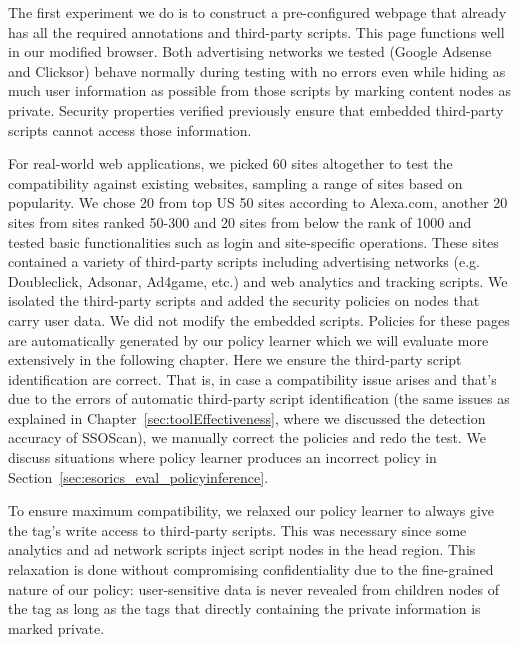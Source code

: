 The first experiment we do is to construct a pre-configured webpage that already has all the required annotations and third-party scripts.  This page functions well in our modified browser.  Both advertising networks we tested (Google Adsense and Clicksor) behave normally during testing with no errors even while hiding as much user information as possible from those scripts by marking content nodes as private.  Security properties verified previously ensure that embedded third-party scripts cannot access those information.  

For real-world web applications, we picked 60 sites altogether to test the compatibility against existing websites, sampling a range of sites based on popularity.  We chose 20 from top US 50 sites according to Alexa.com, another 20 sites from sites ranked 50-300 and 20 sites from below the rank of 1000 and tested basic functionalities such as login and site-specific operations.  These sites contained a variety of third-party scripts including advertising networks (e.g. Doubleclick, Adsonar, Ad4game, etc.) and web analytics and tracking scripts.  We isolated the third-party scripts and added the security policies on nodes that carry user data.  We did not modify the embedded scripts.  Policies for these pages are automatically generated by our policy learner which we will evaluate more extensively in the following chapter.  Here we ensure the third-party script identification are correct.  That is, in case a compatibility issue arises and that's due to the errors of automatic third-party script identification (the same issues as explained in Chapter~\ref{sec:toolEffectiveness}, where we discussed the detection accuracy of SSOScan), we manually correct the policies and redo the test.  We discuss situations where policy learner produces an incorrect policy in Section~\ref{sec:esorics_eval_policyinference}.

To ensure maximum compatibility, we relaxed our policy learner to always give the  tag's write access to third-party scripts.  This was necessary since some analytics and ad network scripts inject script nodes in the head region.  This relaxation is done without compromising confidentiality due to the fine-grained nature of our policy: user-sensitive data is never revealed from children nodes of the  tag as long as the tags that directly containing the private information is marked private.

